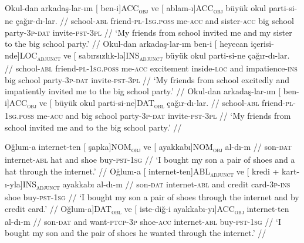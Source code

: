 \pex[exno=TS3, glspace=!1em,everygla={},everyglb={},aboveglbskip=-.15ex, interpartskip=15pt]
\label{TS3-case}
\a
\begingl
\gla Okul-dan arkadaş-lar-ım {[} {ben-i]}ACC\textsubscript{\textsc{obj}} ve {[} {ablam-ı]}ACC\textsubscript{\textsc{obj}} büyük okul parti-si-ne çağır-dı-lar. //
\glb school-\textsc{abl} friend-\textsc{pl}-\textsc{1sg.poss} me-\textsc{acc} and sister-\textsc{acc} big school party-\textsc{3p}-\textsc{dat} invite-\textsc{pst}-\textsc{3pl} //
\glft `My friends from school invited me and my sister to the big school party.' //
\endgl
\a
\begingl
\gla Okul-dan arkadaş-lar-ım ben-i {[} heyecan {içerisi-nde]}LOC\textsubscript{\textsc{adjunct}} ve {[} {sabırsızlık-la]}INS\textsubscript{\textsc{adjunct}} büyük okul parti-si-ne çağır-dı-lar. //
\glb school-\textsc{abl} friend-\textsc{pl}-\textsc{1sg.poss} me-\textsc{acc} excitement inside-\textsc{loc} and impatience-\textsc{ins} big school party-\textsc{3p}-\textsc{dat} invite-\textsc{pst}-\textsc{3pl} //
\glft `My friends from school excitedly and impatiently invited me to the big school party.' //
\endgl
\a
\begingl
\gla Okul-dan arkadaş-lar-ım {[} {ben-i]}ACC\textsubscript{\textsc{obj}} ve {[} büyük okul {parti-si-ne]}DAT\textsubscript{\textsc{obl}} çağır-dı-lar. //
\glb school-\textsc{abl} friend-\textsc{pl}-\textsc{1sg.poss} me-\textsc{acc} and big school party-\textsc{3p}-\textsc{dat} invite-\textsc{pst}-\textsc{3pl} //
\glft `My friends from school invited me and to the big school party.' //
\endgl
\xe

\pex[exno=TS4,glspace=!1em,everygla={},everyglb={},aboveglbskip=-.15ex, interpartskip=15pt]
\label{TS4-case}
\a
\begingl
\gla Oğlum-a internet-ten {[} şapka{]}NOM\textsubscript{\textsc{obj}} ve {[} ayakkabı{]}NOM\textsubscript{\textsc{obj}} al-dı-m //
\glb son-\textsc{dat} internet-\textsc{abl} hat and shoe buy-\textsc{pst}-\textsc{1sg} //
\glft `I bought my son a pair of shoes and a hat through the internet.' //
\endgl
\a
\begingl
\gla Oğlum-a {[} internet-ten{]}ABL\textsubscript{\textsc{adjunct}} ve {[} kredi + kart-ı-yla{]}INS\textsubscript{\textsc{adjunct}} ayakkabı al-dı-m //
\glb son-\textsc{dat} internet-\textsc{abl} and credit card-\textsc{3p}-\textsc{ins} shoe buy-\textsc{pst}-\textsc{1sg} //
\glft `I bought my son a pair of shoes through the internet and by credit card.' //
\endgl
\a
\begingl
\gla {[} Oğlum-a{]}DAT\textsubscript{\textsc{obl}} ve {[} iste-diğ-i ayakkabı-yı{]}ACC\textsubscript{\textsc{obj}} internet-ten al-dı-m //
\glb {}son-\textsc{dat}{} and {}want-\textsc{ptcp}-\textsc{3p} shoe-\textsc{acc}{} internet-\textsc{abl} buy-\textsc{pst}-\textsc{1sg} //
\glft `I bought my son and the pair of shoes he wanted through the internet.' //
\endgl
\xe

